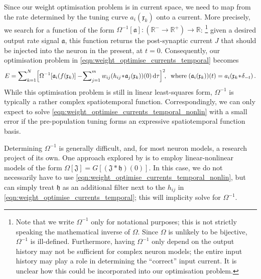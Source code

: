 Since our weight optimisation problem is in current space, we need to map from the rate determined by the tuning curve $a_i(\mathfrak{x}_k)$ onto a current.
More precisely, we search for a function of the form $\Omega^{-1}[\mathfrak{a}] : (\mathbb{R}^- \longrightarrow \mathbb{R}^+) \longrightarrow \mathbb{R}$:%
\footnote{Note that we write $\Omega^{-1}$ only for notational purposes; this is not strictly speaking the mathematical inverse of $\Omega$.
Since $\Omega$ is unlikely to be bijective, $\Omega^{-1}$ is ill-defined.
Furthermore, having $\Omega^{-1}$ only depend on the output history may not be sufficient for complex neuron models; the entire input history may play a role in determining the \enquote{correct} input current.
It is unclear how this could be incorporated into our optimisation problem.
}
given a desired output rate signal $\mathfrak{a}$, this function returns the post-synaptic current $J$ that should be injected into the neuron in the present, at $t = 0$.
Consequently, our optimisation problem in \cref{eqn:weight_optimise_currents_temporal} becomes
\begin{align}
	E = \sum\nolimits_{k = 1}^N \Bigl[
		\Omega^{-1}[\mathfrak{a}_i(f(\mathfrak{x}_k)] -
		\!\sum\nolimits_{j = 1}^m w_{ij} (h_{ij} \! \ast \! \mathfrak{a}_j(\mathfrak{x}_k))(0) \,\mathrm{d}\tau
	\Bigr]^2 \!, \;\;
	\text{where} \; (\mathfrak{a}_i(\mathfrak{x}_k))(t) = a_i(\mathfrak{x}_k \! \ast \! \delta_{-t}) \,.
	\label{eqn:weight_optimise_currents_temporal_nonlin}
\end{align}
While this optimisation problem is still in linear least-squares form, $\Omega^{-1}$ is typically a rather complex spatiotemporal function.
Correspondingly, we can only expect to solve \cref{eqn:weight_optimise_currents_temporal_nonlin} with a small error if the pre-population tuning forms an expressive spatiotemporal function basis.

Determining $\Omega^{-1}$ is generally difficult, and, for most neuron models, a research project of its own.
One approach explored by \citet{hunsberger2016system} is to employ linear-nonlinear models of the form $\Omega[\mathfrak{J}] = G[(\mathfrak{J} \ast \mathfrak{h})(0)]$.
In this case, we do not necessarily have to use \cref{eqn:weight_optimise_currents_temporal_nonlin}, but can simply treat $\mathfrak{h}$ as an additional filter next to the $h_{ij}$ in \cref{eqn:weight_optimise_currents_temporal}; this will implicity solve for $\Omega^{-1}$.

